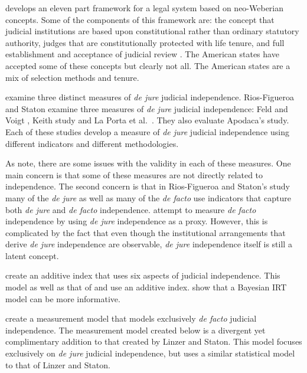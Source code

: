 \documentclass[12pt]{article}
\begin{document}
\citet{Schmidhauser1987} develops an eleven part framework for a legal system based on neo-Weberian concepts.  Some of the components of this framework are: the concept that judicial institutions are based upon constitutional rather than ordinary statutory authority,  judges that are constitutionally protected with life tenure, and full establishment and acceptance of judicial review \cite[46-47]{Schmidhauser1987}.  The American states have accepted some of these concepts but clearly not all.  The American states are a mix of selection methods and tenure.

\citet{Rios2014} examine three distinct measures of \textit{de jure} judicial independence.  Rios-Figueroa and Staton examine three measures of \textit{de jure} judicial independence: Feld and Voigt \citeyearpar{Feld2003}, Keith \citeyearpar{Keith2002a} study and La Porta et al.\ \citeyearpar{Laporta2004}.  They also evaluate Apodaca's \citeyearpar{Apodaca2004} study.  Each of these studies develop a measure of \textit{de jure} judicial independence using different indicators and different methodologies.

As \citet{Rios2014} note, there are some issues with the validity in each of these measures.  One main concern is that some of these measures are not directly related to independence.  The second concern is that in Rios-Figueroa and Staton's study many of the \textit{de jure} as well as many of the \textit{de facto} use indicators that capture both \textit{de jure} and \textit{de facto} independence.  \citet*{Laporta2004} attempt to measure \textit{de facto} independence by using \textit{de jure} independence as a proxy.  However, this is complicated by the fact that even though the institutional arrangements that derive \textit{de jure} independence are observable, \textit{de jure} independence itself is still a latent concept. 

\citet*{Melton2014} create an additive index that uses six aspects of judicial independence.  This model as well as that of \citet*{Voigt2007} and \citet*{Keith2002b} use an additive index.  \citet*{Linzer2014} show that a Bayesian IRT model can be more informative.

\citet*{Linzer2014} create a measurement model that models exclusively \textit{de facto} judicial independence.  The measurement model created below is a divergent yet complimentary addition to that created by Linzer and Staton.  This model focuses exclusively on \textit{de jure} judicial independence, but uses a similar statistical model to that of Linzer and Staton.  
\end{document}

